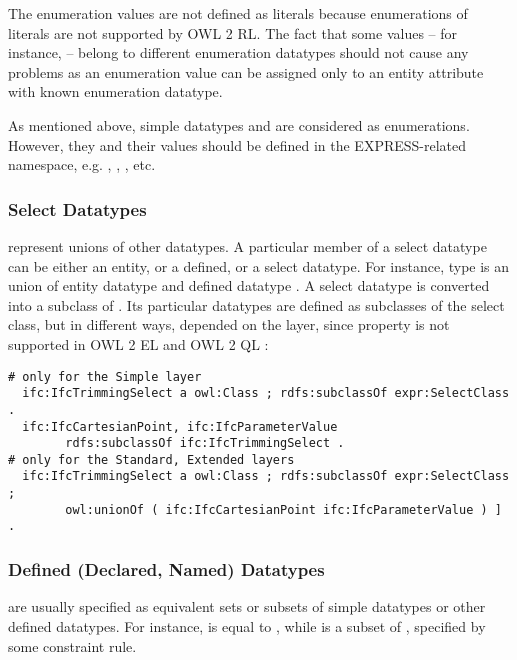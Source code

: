 The enumeration values are not defined as literals because enumerations of literals are not supported by OWL 2 RL. The fact that some values -- for instance,  -- belong to different enumeration data\-types should not cause any problems as an enumeration value can be assigned only to an entity attribute with known enumeration data\-type.

As mentioned above, simple data\-types  and  are considered as enumerations. However, they and their values should be defined in the EXPRESS-related namespace, e.g. , , , etc.



\subsubsection{Select Datatypes} represent unions of other data\-types. A particular member of a select data\-type can be either an entity, or a defined, or a select data\-type. For instance, type  is an union of entity data\-type  and defined data\-type . A select data\-type is converted into a subclass of . Its particular data\-types are defined as subclasses of the select class, but in different ways, depended on the layer, since property  is not supported in OWL 2 EL and OWL 2 QL \cite{motik2012owl}:

\begin{lstlisting}
# only for the Simple layer
  ifc:IfcTrimmingSelect a owl:Class ; rdfs:subclassOf expr:SelectClass .
  ifc:IfcCartesianPoint, ifc:IfcParameterValue
        rdfs:subclassOf ifc:IfcTrimmingSelect .
# only for the Standard, Extended layers
  ifc:IfcTrimmingSelect a owl:Class ; rdfs:subclassOf expr:SelectClass ;
        owl:unionOf ( ifc:IfcCartesianPoint ifc:IfcParameterValue ) ] .
\end{lstlisting}




\subsubsection{Defined (Declared, Named) Datatypes} are usually specified as equivalent sets or subsets of simple data\-types or other defined data\-types. For instance,  is equal to , while  is a subset of , specified by some constraint rule.

